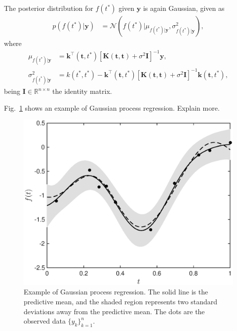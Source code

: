 \documentclass[journal]{IEEEtran}
\newcommand{\simo}[1]{{\color{red}#1}}
\begin{document}
The posterior distribution for $f(t^*)$ given $\mathbf{y}$ is again Gaussian, given as
\begin{align*}
p(f(t^*)|\mathbf{y}) & =\mathcal{N}(f(t^*)|\mu_{f(t^*)|\mathbf{y}}, \sigma^2_{f(t^*)|\mathbf{y}}),
\end{align*}
where
\begin{align*}
\mu_{f(t^*)|\mathbf{y}} & = \mathbf{k}^{\top}(\mathbf{t}, t^*)\left[\mathbf{K}(\mathbf{t}, \mathbf{t}) +
\sigma^2\mathbf{I}\right]^{-1}\mathbf{y},\\
\sigma^2_{f(t^*)|\mathbf{y}} & = k(t^*, t^*) - \mathbf{k}^{\top}(\mathbf{t}, t^*)\left[\mathbf{K}(\mathbf{t}, \mathbf{t}) +
\sigma^2\mathbf{I}\right]^{-1}\mathbf{k}(\mathbf{t}, t^*),
\end{align*}
being $\mathbf{I}\in\mathbb{R}^{n\times n}$ the identity matrix.

Fig.~\ref{reg_ex} shows an example of Gaussian process regression. \simo{Explain more.}

\begin{figure}[!t]
\centering
\includegraphics[width=\columnwidth]{toyGPoutput}
\caption{Example of Gaussian process regression. The solid line is the
predictive mean, and the shaded region represents two standard
deviations away from the predictive mean. The dots are the observed
data $\{y_k\}_{k=1}^n$.}
\label{reg_ex}
\end{figure}
\end{document}

